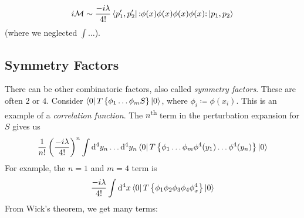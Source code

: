 \begin{example}[$\phi\phi \to \phi\phi$]
  \begin{equation}
    i \mathcal{M} \sim \frac{-i \lambda}{4!} \bra{p_1', p_2'} \mathop{:}\nolimits\!\phi(x) \phi(x) \phi(x) \phi(x)\!\mathop{:}\nolimits \ket{ p_1, p_2}
  \end{equation}
  (where we neglected $\int \dots$).
\end{example}

\subsection{Symmetry Factors}%
\label{sub:combinatoric_factors}

There can be other combinatoric factors, also called \emph{symmetry factors}. These are often $2$ or $4$.
Consider $\bra{0} T \left\{ \phi_1 \dots \phi_m S \right\} \ket{0}$, where $\phi_i \coloneqq \phi(x_i)$.
This is an example of a \emph{correlation function}.
The $n$\textsuperscript{th} term in the perturbation expansion for $S$ gives us 
\begin{equation}
  \frac{1}{n!} \left( \frac{-i\lambda}{4!} \right)^n \int \dd[4]{y_n} \dots \dd[4]{y_n} \bra{0} T \left\{ \phi_1 \dots \phi_m \phi^4 (y_1) \dots \phi^4 (y_n) \right\} \ket{0}
\end{equation}
For example, the $n = 1$ and $m = 4$ term is
\begin{equation}
  \frac{-i\lambda}{4!} \int \dd[4]{x} \bra{0} T \left\{ \phi_1\phi_2\phi_3\phi_4 \phi^4_x \right\} \ket{0}
\end{equation}
From Wick's theorem, we get many terms:
